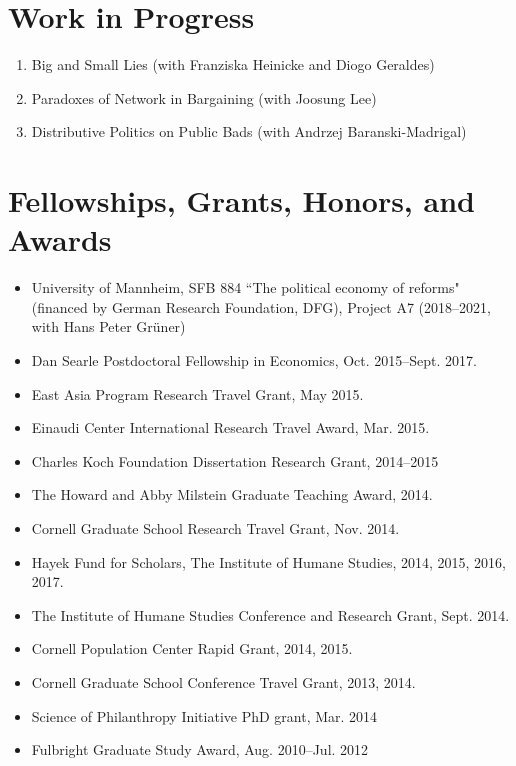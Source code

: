 \documentclass[margin, letterpaper]{res}
\begin{document}
\begin{resume}
\section{Work in Progress}
\begin{enumerate}
\item Big and Small Lies (with Franziska Heinicke and Diogo Geraldes)
\item Paradoxes of Network in Bargaining (with Joosung Lee)
\item Distributive Politics on Public Bads (with Andrzej Baranski-Madrigal)
\end{enumerate}

\section{Fellowships, Grants, Honors, and Awards}
\begin{itemize}
\item University of Mannheim, SFB 884 ``The political economy of reforms" (financed by German Research Foundation, DFG), Project A7 (2018--2021, with Hans Peter Gr{\"u}ner)
\item Dan Searle Postdoctoral Fellowship in Economics, Oct. 2015--Sept. 2017.
\item East Asia Program Research Travel Grant, May 2015.
\item Einaudi Center International Research Travel Award, Mar. 2015.
\item Charles Koch Foundation Dissertation Research Grant, 2014--2015
\item The Howard and Abby Milstein Graduate Teaching Award, 2014.
\item Cornell Graduate School Research Travel Grant, Nov. 2014.
\item Hayek Fund for Scholars, The Institute of Humane Studies, 2014, 2015, 2016, 2017.
\item The Institute of Humane Studies Conference and Research Grant, Sept. 2014.
\item Cornell Population Center Rapid Grant, 2014, 2015.
\item Cornell Graduate School Conference Travel Grant, 2013, 2014.
\item Science of Philanthropy Initiative PhD grant, Mar. 2014
\item Fulbright Graduate Study Award, Aug. 2010--Jul. 2012

\end{itemize}
\end{resume}
\end{document}
